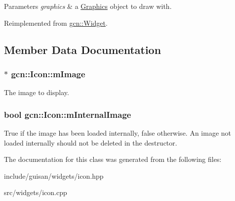 \begin{DoxyParams}{Parameters}
{\em graphics} & a \hyperlink{classgcn_1_1Graphics}{Graphics} object to draw with. \\
\hline
\end{DoxyParams}


Reimplemented from \hyperlink{classgcn_1_1Widget_a58c3b2f513d8e029e321fd88a974f5c4}{gcn\+::\+Widget}.



\subsection{Member Data Documentation}
\subsubsection[{\texorpdfstring{m\+Image}{mImage}}]{$\ast$ gcn\+::\+Icon\+::m\+Image\hspace{0.3cm}{\ttfamily [protected]}}\hypertarget{classgcn_1_1Icon_afeed96d96fc1f8cbe51fff7a1933dcc7}{}\label{classgcn_1_1Icon_afeed96d96fc1f8cbe51fff7a1933dcc7}
The image to display. 
\subsubsection[{\texorpdfstring{m\+Internal\+Image}{mInternalImage}}]{\setlength{\rightskip}{0pt plus 5cm}bool gcn\+::\+Icon\+::m\+Internal\+Image\hspace{0.3cm}{\ttfamily [protected]}}\hypertarget{classgcn_1_1Icon_add136055bf50bf4cf6da058903d89239}{}\label{classgcn_1_1Icon_add136055bf50bf4cf6da058903d89239}
True if the image has been loaded internally, false otherwise. An image not loaded internally should not be deleted in the destructor. 

The documentation for this class was generated from the following files\+:\begin{DoxyCompactItemize}
\item 
include/guisan/widgets/icon.\+hpp\item 
src/widgets/icon.\+cpp\end{DoxyCompactItemize}
